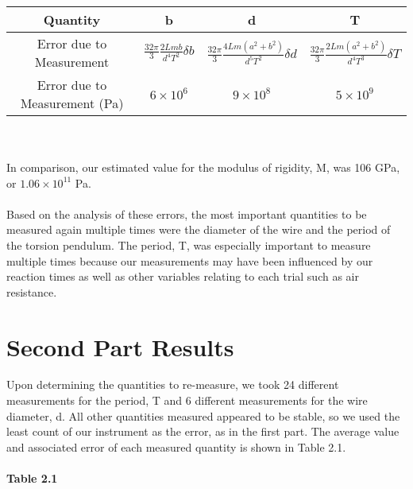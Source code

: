 \documentclass[12pt, leqno]{article}
\begin{document}
\\\\\\
\begin{tabular}{|c|c|c|c|}
\hline
Quantity & b & d & T\\
\hline
Error due to Measurement & $\frac{32\pi}{3}\frac{2Lmb}{d^4 T^2}\delta b$ & $\frac{32\pi}{3}\frac{4Lm(a^2+b^2)}{d^5 T^2}\delta d$ & $\frac{32\pi}{3}\frac{2Lm(a^2+b^2)}{d^4 T^3}\delta T$\\
\hline
Error due to Measurement (Pa)& $6\times10^6$ & $9\times10^8$ & $5\times10^9$\\
\hline
\end{tabular}\\\\
In comparison, our estimated value for the modulus of rigidity, M, was 106 GPa, or $1.06\times10^{11}$ Pa.\\\\
Based on the analysis of these errors, the most important quantities to be measured again multiple times were the diameter of the wire and the period of the torsion pendulum.  The period, T, was especially important to measure multiple times because our measurements may have been influenced by our reaction times as well as other variables relating to each trial such as air resistance.
\section*{Second Part Results}
Upon determining the quantities to re-measure, we took 24 different measurements for the period, T and 6 different measurements for the wire diameter, d.  All other quantities measured appeared to be stable, so we used the least count of our instrument as the error, as in the first part.  The average value  and associated error of each measured quantity is shown in Table 2.1.\\\\
\textbf{Table 2.1}\\\\
\end{document}
